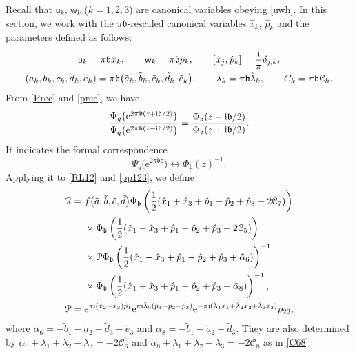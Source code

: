 \documentclass[pdftex]{sigma}
\newcommand{\bb}{{\mathfrak b}}
\newcommand{\e}{{\mathrm e}}
\newcommand{\uu}{{\mathsf u}}
\newcommand{\ww}{{\mathsf w}}
\numberwithin{equation}{section}
\begin{document}
Recall that $\uu_k$, $\ww_k$ ($k=1, 2, 3$) are canonical variables
obeying \eqref{uwh}. In this section, we work with the
$\pi \bb$-rescaled canonical variables $\hat{x}_k$, $\hat{p}_k$ and
the parameters defined as follows:
\begin{gather}
\uu_k =\pi \bb \hat{x}_k,\qquad
\ww_k = \pi \bb \hat{p}_k,
\qquad [\hat{x}_j, \hat{p}_k] = \frac{\rm i}{\pi} \delta_{j,k},\nonumber
\\
(a_k,b_k, c_k, d_k,e_k) =
\pi \bb \bigl(\tilde{a}_k, \tilde{b}_k, \tilde{c}_k, \tilde{d}_k, \tilde{e}_k\bigr),
\qquad \lambda_k = \pi \bb \tilde{\lambda}_k,\qquad C_k =\pi \bb \mathcal{C}_k.
\label{cbc}
\end{gather}
%
From \eqref{Prec} and \eqref{prec}, we have
\[
\frac{\Psi_q\bigl(\e^{2\pi \bb(z+ {\rm i}\bb/2)}\bigr)}
{\Psi_q\bigl(\e^{2\pi \bb(z- {\rm i}\bb/2)}\bigr)}
= \frac{\Phi_\bb(z-{\rm i} \bb/2)}{\Phi_\bb(z+{\rm i} \bb/2)}.
\]
It indicates the formal correspondence
\begin{equation}\label{cor}
\Psi_q\bigl(\e^{2\pi \bb z}\bigr) \leftrightarrow
\Phi_\bb(z)^{-1}.
\end{equation}
Applying it to \eqref{RL12} and \eqref{pp123}, we define
\begin{align}%
\mathcal{R}
={}& f\bigl({\tilde a}, {\tilde b}, {\tilde c}, {\tilde d}\bigr)
\Phi_\bb\left(\frac{1}{2}(\hat{x}_1 + \hat{x}_3 + \hat{p}_1 - \hat{p}_2 + \hat{p}_3 +2\mathcal{C}_7)\right)\nonumber\\
& \times
\Phi_\bb\left(\frac{1}{2}(\hat{x}_1 - \hat{x}_3 + \hat{p}_1 - \hat{p}_2 + \hat{p}_3 +2\mathcal{C}_5)\right)
\nonumber\\
& \times \mathcal{P}
\Phi_\bb\left(\frac{1}{2}(\hat{x}_1 - \hat{x}_3 + \hat{p}_1 - \hat{p}_2 + \hat{p}_3 +\tilde{\alpha}_6)\right)^{-1}\nonumber\\
& \times
\Phi_\bb\left(\frac{1}{2}(\hat{x}_1 + \hat{x}_3 + \hat{p}_1 - \hat{p}_2 + \hat{p}_3 +\tilde{\alpha}_8)\right)^{-1},
\nonumber
\\
\mathcal{P}={}& \e^{\pi {\rm i}(\hat{x}_2-\hat{x}_3)\hat{p}_1}
\e^{\pi {\rm i}\tilde{\lambda}_0(\hat{p}_1+\hat{p}_2-\hat{p}_3)}
\e^{-\pi {\rm i}(\tilde{\lambda}_1\hat{x}_1+\tilde{\lambda}_2\hat{x}_2+\tilde{\lambda}_3\hat{x}_3)}
\rho_{23},
\label{RRf}
\end{align}
where
$\tilde{\alpha}_6= -\tilde{b}_1-\tilde{a}_2-\tilde{d}_3-\tilde{e}_3$ and
$\tilde{\alpha}_8 = -\tilde{b}_1-\tilde{a}_2-\tilde{d}_3$.
They are also determined by
$\tilde{\alpha}_6+\tilde{\lambda}_1+\tilde{\lambda}_2-\tilde{\lambda}_3=-2\mathcal{C}_6$ and
$\tilde{\alpha}_8+\tilde{\lambda}_1+\tilde{\lambda}_2-\tilde{\lambda}_3=-2\mathcal{C}_8$
as in \eqref{C68}.
\end{document}
